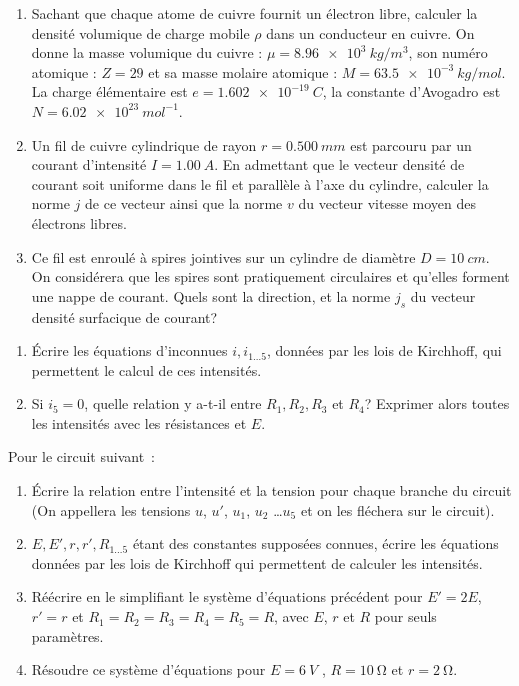 \begin{exercice}%
  \begin{enumerate}
  \item Sachant que chaque atome de cuivre fournit un électron libre, calculer 
    la densité volumique de charge mobile \(\rho\) dans un conducteur en 
      cuivre. On donne la masse volumique du cuivre : \(\mu = 
      \SI{8,96e3}{kg/m^3}\), son numéro atomique : \(Z = 29\) et sa masse 
      molaire atomique : \(M = \SI{63,5e-3}{kg/mol}\). La charge élémentaire 
      est \(e = \SI{1,602e-19}{C}\), la constante d'Avogadro est \(N  = 
      \SI{6,02e23}{mol^{-1}}\).
  \item Un fil de cuivre cylindrique de rayon \(r = \SI{0,500}{mm}\) est 
    parcouru par un courant d'intensité \(I = \SI{1,00}{A}\). En admettant que 
      le vecteur densité de courant soit uniforme dans le fil et parallèle à 
      l'axe du cylindre, calculer la norme \(j\) de ce vecteur ainsi que la 
      norme \(v\) du vecteur vitesse moyen des électrons libres.
  \item Ce fil est enroulé à spires jointives sur un cylindre de diamètre \(D = 
    \SI{10}{cm}\). On considérera que les spires sont pratiquement circulaires 
      et qu'elles forment une nappe de courant. Quels sont la direction, et la 
      norme \(j_s\) du vecteur densité surfacique de courant?
  \end{enumerate}
\end{exercice}%
\begin{exercice}%
  \begin{enumerate}
  \item Écrire les équations d'inconnues \(i, i_{1 \ldots 5}\), données par les 
    lois de Kirchhoff, qui permettent le calcul de ces intensités.
  \item Si \(i_5 = 0\), quelle relation y a-t-il entre \(R_1, R_2, R_3\) et 
    \(R_4\)? Exprimer alors toutes les intensités avec les résistances et 
      \(E\).
  \end{enumerate}
\end{exercice}%
\begin{exercice}%
  Pour le circuit suivant~:
  \begin{enumerate}
  \item Écrire la relation entre l'intensité et la tension pour chaque branche 
    du circuit (On appellera les tensions \(u\), \(u'\), \(u_1\), \(u_2\) 
      \ldots \(u_5\) et on les fléchera sur le circuit).
  \item \(E, E', r, r', R_{1 \ldots 5}\) étant des constantes supposées connues, 
    écrire les équations données par les lois de Kirchhoff qui permettent de 
      calculer les intensités.
  \item Réécrire en le simplifiant le système d'équations précédent pour \(E' = 
    2 E\), \(r' = r\) et \(R_1 = R_2 = R_3 = R_4 = R_5 = R\), avec \(E\), \(r\) 
      et \(R\) pour seuls paramètres.
  \item Résoudre ce système d'équations pour \(E = \SI{6}{V}\) , \(R = 
    \SI{10}{\ohm}\) et \(r = \SI{2}{\ohm}\).
  \end{enumerate}
\end{exercice}%

